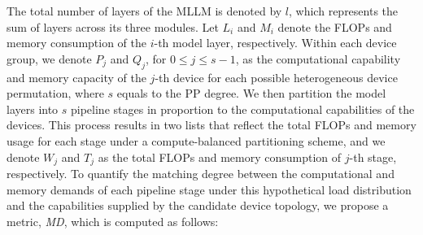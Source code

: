 \documentclass[conference]{IEEEtran}
\begin{document}
The total number of layers of the MLLM is denoted by $l$, which represents the sum of layers across its three modules.
Let $L_i$ and $M_i$ denote the FLOPs and memory consumption of the $i$-th model layer, respectively.
Within each device group, we denote $P_j$ and $Q_j$, for $0\leq j \leq s-1$, as the computational capability and memory capacity of the $j$-th device for each possible heterogeneous device permutation, where $s$ equals to the PP degree.
We then partition the model layers into $s$ pipeline stages in proportion to the computational capabilities of the devices.
This process results in two lists that reflect the total FLOPs and memory usage for each stage under a compute-balanced partitioning scheme, and we denote $W_j$ and $T_j$ as the total FLOPs and memory consumption of $j$-th stage, respectively. 
To quantify the matching degree between the computational and memory demands of each pipeline stage under this hypothetical load distribution and the capabilities supplied by the candidate device topology, we propose a metric, \textit{MD}, which is computed as follows:
\end{document}
